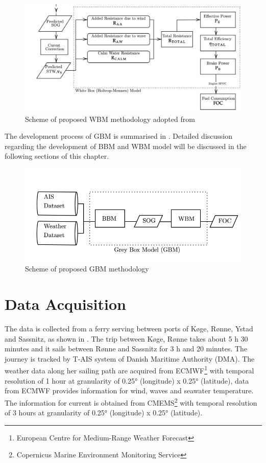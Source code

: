 \begin{figure}[h]
    \centering
        \includegraphics[width=\textwidth]{02_figures/flowmethod_WBM.png}
        \caption{Scheme of proposed WBM methodology adopted from }
        \label{fig:flowchart_WBM}
\end{figure}

The development process of GBM is summarised in . Detailed discussion regarding the development of BBM and WBM model will be discussed in the following sections of this chapter.

\begin{figure}[h]
    \centering
        \includegraphics[width=.85\textwidth]{02_figures/flowmethod_GBM_alt.png}
        \caption{Scheme of proposed GBM methodology}
        \label{fig:flowchart_GBM}
\end{figure}


\section{Data Acquisition}\label{sec:data_acquisition}

The data is collected from a ferry serving between ports of K{\o}ge, R{\o}nne, Ystad and Sassnitz, as shown in  . The trip between K{\o}ge, R{\o}nne takes about 5 h 30 minutes and it sails between R{\o}nne and Sassnitz for 3 h and 20 minutes. The journey is tracked by T-AIS system of Danish Maritime Authority (DMA). The weather data along her sailing path are acquired from ECMWF\footnote{European Centre for Medium-Range Weather Forecast} with temporal resolution of 1 hour at granularity of 0.25° (longitude) x 0.25° (latitude), data from ECMWF provides information for wind, waves and seawater temperature. The information for current is obtained from CMEMS\footnote{Copernicus Marine Environment Monitoring Service} with temporal resolution of 3 hours at granularity of  0.25° (longitude) x 0.25° (latitude).\\ 

